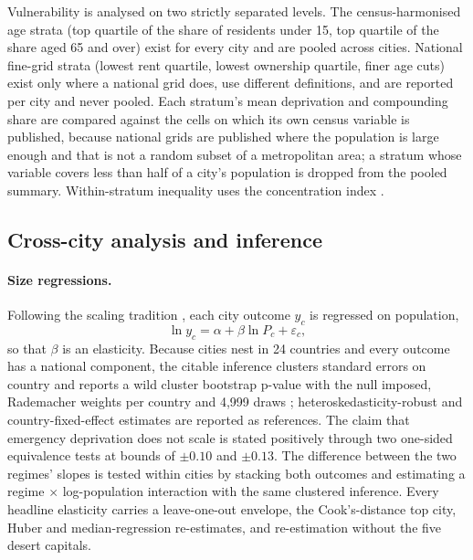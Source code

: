 \documentclass[11pt]{article}
\begin{document}
Vulnerability is analysed on two strictly separated levels. The
census-harmonised age strata (top quartile of the share of residents under
15, top quartile of the share aged 65 and over) exist for every city and
are pooled across cities. National fine-grid strata (lowest rent quartile,
lowest ownership quartile, finer age cuts) exist only where a national
grid does, use different definitions, and are reported per city and never
pooled. Each stratum's mean deprivation and compounding share are compared
against the cells on which its own census variable is published, because
national grids are published where the population is large enough and
that is not a random subset of a metropolitan area; a stratum whose
variable covers less than half of a city's population is dropped from the
pooled summary. Within-stratum inequality uses the concentration index
\citep{wagstaff1991measurement}.

\subsection{Cross-city analysis and inference}\label{sec:m-inference}

\paragraph{Size regressions.} Following the scaling tradition
\citep{bettencourt2007growth}, each city outcome $y_c$ is regressed on
population,
\begin{equation}
\ln y_c = \alpha + \beta \ln P_c + \varepsilon_c ,
\label{eq:scaling}
\end{equation}
so that $\beta$ is an elasticity. Because cities nest in 24 countries and
every outcome has a national component, the citable inference clusters
standard errors on country and reports a wild cluster bootstrap p-value
with the null imposed, Rademacher weights per country and 4{,}999 draws
\citep{cameron2008bootstrap,mackinnon2023cluster}; heteroskedasticity-robust
and country-fixed-effect estimates are reported as references. The claim
that emergency deprivation does not scale is stated positively through two
one-sided equivalence tests \citep{lakens2017equivalence} at bounds of
$\pm 0.10$ and $\pm 0.13$. The difference between the two regimes' slopes
is tested within cities by stacking both outcomes and estimating a regime
$\times$ log-population interaction with the same clustered inference.
Every headline elasticity carries a leave-one-out envelope, the
Cook's-distance top city, Huber and median-regression re-estimates, and
re-estimation without the five desert capitals.
\end{document}
